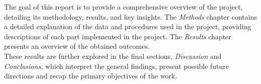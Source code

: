 
The goal of this report is to provide a comprehensive overview of the project,
detailing its methodology, results, and key insights. 
The \textit{Methods} chapter contains a detailed explanation of the data and
procedures used in the project, providing descriptions of each part implemented
in the project.
The \textit{Results} chapter presents an overview of the
obtained outcomes.\\
These results are further explored in the final sections, \textit{Discussion}
and \textit{Conclusions}, which interpret the general findings, present possible
future directions and recap the
primary objectives of the work.